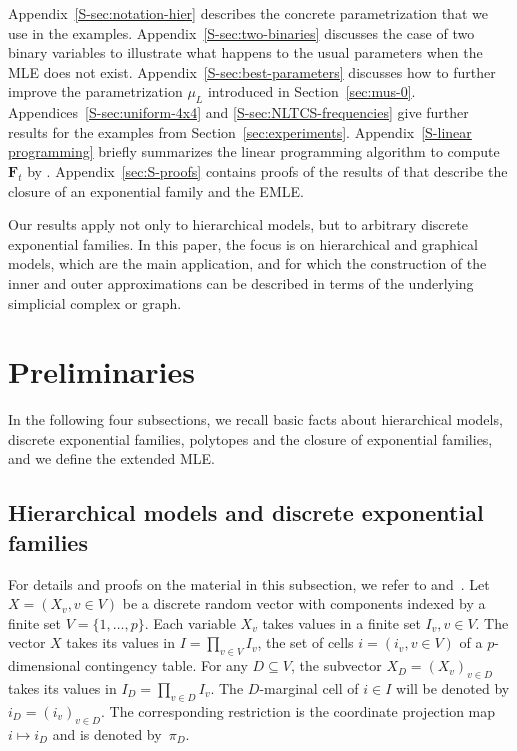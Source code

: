 \documentclass[aos,noinfoline]{imsart}
\newcommand{\Fbf}{\mathbf{F}}
\theoremstyle{remark}
\theoremstyle{definition}
\begin{document}
  Appendix~\ref{S-sec:notation-hier} describes the concrete parametrization that we use in the examples.
  Appendix~\ref{S-sec:two-binaries} discusses the case of two binary variables to illustrate what happens to the usual parameters when the MLE does not exist.
  Appendix~\ref{S-sec:best-parameters} discusses how to further improve the parametrization $\mu_{L}$ introduced in Section~\ref{sec:mus-0}.
  Appendices~\ref{S-sec:uniform-4x4} and \ref{S-sec:NLTCS-frequencies} give further results for the examples from Section~\ref{sec:experiments}.
  Appendix~\ref{S-linear programming} briefly summarizes the linear programming algorithm to compute~$\Fbf_{t}$ by \citet{FienbergRinaldo12:MLE_in_loglinear_models}.
  Appendix~\ref{sec:S-proofs} contains proofs of the results of \citet{Barndorff:exponential_families} that describe the closure of an exponential family and the EMLE.
  
Our results apply not only to hierarchical models, but to arbitrary discrete exponential families.  In this paper, the focus is on
hierarchical and graphical models, which are the main application,  and for which the construction
of the inner and outer approximations can be described in terms of the underlying simplicial complex or graph.


\section{Preliminaries}
\label{sec:preliminaries}
\label{sec:mus-0}

In the following four subsections, %
we recall basic facts about hierarchical models, discrete exponential families, polytopes and the closure of
exponential families, and we define the extended MLE.

\subsection{Hierarchical models and discrete exponential families}
\label{sec:hierarchical-models}
\label{sec:discr-expon-famil}

For details and proofs on the material in this subsection, we refer to \citet{LetacMassam12:Bayes_regularization}
and~\citet{RKA10:Support_Sets_and_Or_Mat}.  Let $X=(X_v,v\in V)$ be a discrete random vector with components indexed by
a finite set $V=\{1,\ldots,p\}$.  Each variable $X_v$ takes values in a finite set $I_v, v\in V$.  The vector $X$ takes
its values in
$%
I=\prod_{v\in V}I_v$, %
the set of cells $i=(i_v, v\in V)$ of a $p$-dimensional contingency table.
For any $D\subseteq V$, the subvector $X_{D}=(X_{v})_{v\in D}$ takes its values in $I_{D}=\prod_{v\in D}I_{v}$.
The $D$-marginal cell of $i\in I$ will be denoted by $i_{D}=(i_{v})_{v\in D}$.
The corresponding restriction is the coordinate projection map $i\mapsto i_{D}$ and is denoted by~$\pi_{D}$.
\end{document}
